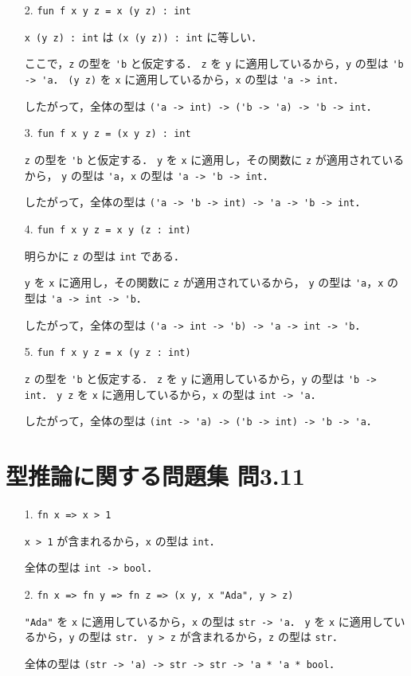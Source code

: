 \documentclass[a4paper, lualatex, ja=standard]{bxjsarticle}
\begin{document}
\begin{enumerate}
\item[2.] \verb|fun f x y z = x (y z) : int|

  \verb|x (y z) : int| は \verb|(x (y z)) : int| に等しい．

  ここで，\verb|z| の型を \verb|'b| と仮定する．
  \verb|z| を \verb|y| に適用しているから，\verb|y| の型は \verb|'b -> 'a|．
  \verb|(y z)| を \verb|x| に適用しているから，\verb|x| の型は \verb|'a -> int|．

  したがって，全体の型は \verb|('a -> int) -> ('b -> 'a) -> 'b -> int|．

\item[3.] \verb|fun f x y z = (x y z) : int|

  \verb|z| の型を \verb|'b| と仮定する．
  \verb|y| を \verb|x| に適用し，その関数に \verb|z| が適用されているから，
  \verb|y| の型は \verb|'a|，\verb|x| の型は \verb|'a -> 'b -> int|．

  したがって，全体の型は \verb|('a -> 'b -> int) -> 'a -> 'b -> int|．

\item[4.] \verb|fun f x y z = x y (z : int)|

  明らかに \verb|z| の型は \verb|int| である．

  \verb|y| を \verb|x| に適用し，その関数に \verb|z| が適用されているから，
  \verb|y| の型は \verb|'a|，\verb|x| の型は \verb|'a -> int -> 'b|．

  したがって，全体の型は \verb|('a -> int -> 'b) -> 'a -> int -> 'b|．

\item[5.] \verb|fun f x y z = x (y z : int)|

  \verb|z| の型を \verb|'b| と仮定する．
  \verb|z| を \verb|y| に適用しているから，\verb|y| の型は \verb|'b -> int|．
  \verb|y z| を \verb|x| に適用しているから，\verb|x| の型は \verb|int -> 'a|．

  したがって，全体の型は \verb|(int -> 'a) -> ('b -> int) -> 'b -> 'a|．
\end{enumerate}

\section{型推論に関する問題集 問3.11}

\begin{enumerate}
\item[1.] \verb|fn x => x > 1|

  \verb|x > 1| が含まれるから，\verb|x| の型は \verb|int|．

  全体の型は \verb|int -> bool|．

\item[2.] \verb|fn x => fn y => fn z => (x y, x "Ada", y > z)|

  \verb|"Ada"| を \verb|x| に適用しているから，\verb|x| の型は \verb|str -> 'a|．
  \verb|y| を \verb|x| に適用しているから，\verb|y| の型は \verb|str|．
  \verb|y > z| が含まれるから，\verb|z| の型は \verb|str|．

  全体の型は \verb|(str -> 'a) -> str -> str -> 'a * 'a * bool|．

\end{enumerate}
\end{document}
